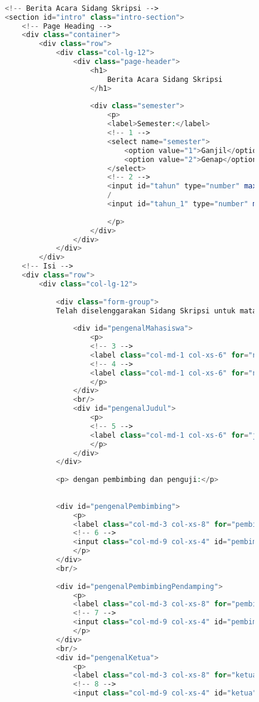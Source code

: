 \begin{lstlisting}[language=PHP,basicstyle=\tiny,caption=skripsi.php]
			
			
			<!-- Berita Acara Sidang Skripsi -->
			<section id="intro" class="intro-section">
				<!-- Page Heading -->
				<div class="container">
					<div class="row">
						<div class="col-lg-12">
							<div class="page-header">
								<h1>
									Berita Acara Sidang Skripsi
								</h1>
							
								<div class="semester">
									<p> 
									<label>Semester:</label>
									<!-- 1 -->
									<select name="semester">
										<option value="1">Ganjil</option>
										<option value="2">Genap</option>
									</select>
									<!-- 2 -->
									<input id="tahun" type="number" max="9999" ng-model="tahun" name="tahun"/>
									/
									<input id="tahun_1" type="number" max="9999" value="{{tahun + 1}}" disabled="disabled"/>
									
									</p>
								</div>
							</div>
						</div>
					</div>
				<!-- Isi -->
				<div class="row">
					<div class="col-lg-12">
					
						<div class="form-group">
						Telah diselenggarakan Sidang Skripsi untuk mata kuliah AIF402-6 Skripsi 2 bagi:
						
							<div id="pengenalMahasiswa">
								<p>
								<!-- 3 -->
								<label class="col-md-1 col-xs-6" for="npm">NPM:</label><input maxlength="10" id="npm" class="inline-form col-md-3 col-xs-6" ng-model="n_npm" name="npm"/>
								<!-- 4 -->
								<label class="col-md-1 col-xs-6" for="nama">Nama:</label><input id="nama" class="inline-form col-md-7 col-xs-6" name="nama"/>
								</p>
							</div>
							<br/>
							<div id="pengenalJudul">
								<p>
								<!-- 5 -->
								<label class="col-md-1 col-xs-6" for="judul">Judul:</label><input id="judul" class="inline-form col-md-11 col-xs-6" name="judul"/>
								</p>
							</div>
						</div>
					
						<p> dengan pembimbing dan penguji:</p>
					
					
						<div id="pengenalPembimbing">
							<p>
							<label class="col-md-3 col-xs-8" for="pembimbing">Pembimbing:</label>
							<!-- 6 -->
							<input class="col-md-9 col-xs-4" id="pembimbing" name="namaPembimbing"/>
							</p>
						</div>
						<br/>
					
						<div id="pengenalPembimbingPendamping">
							<p>
							<label class="col-md-3 col-xs-8" for="pembimbing2">Pembimbing Pendamping:</label>
							<!-- 7 -->
							<input class="col-md-9 col-xs-4" id="pembimbing2" name="namaPembimbingPendamping"/>
							</p>
						</div>
						<br/>
						<div id="pengenalKetua">
							<p>
							<label class="col-md-3 col-xs-8" for="ketua">Ketua Tim Penguji:</label>
							<!-- 8 -->
							<input class="col-md-9 col-xs-4" id="ketua" name="namaKetuaTimPenguji"/>
							

\end{lstlisting}
